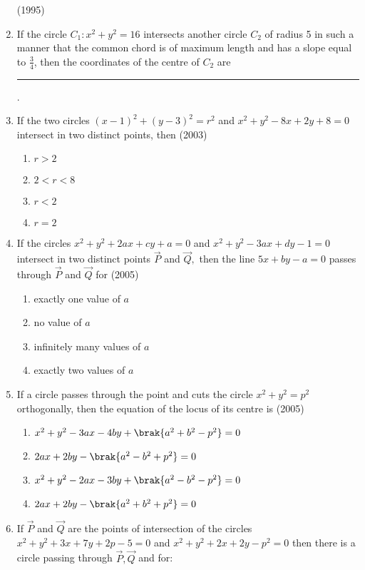 \begin{enumerate}[label=\thesubsection.\arabic*.,ref=\thesubsection.\theenumi]
	      \hfill(1995)
\item If the circle $C_1:x^{2}+y^{2}=16$ intersects another circle $C_2$ of radius 5 in such a manner that the common chord is of maximum length and has a slope equal to $\frac{3}{4}$,  then the coordinates of the centre of $C_2$ are
\rule{1cm}{0.01pt}.
%
	\hfill{}
\item If the two circles $(x-1)^2+(y-3)^2=r^2$ and $x^2+y^2-8x+2y+8=0$ intersect in two distinct points,  then \hfill(2003)
\begin{multicols}{4}
\begin{enumerate}
\item$r>2$
\item$2<r<8$
\item$r<2$
\item$r=2$
\end{enumerate}
\end{multicols}
\item If the circles $x^2+y^2+2ax+cy+a=0$ and $x^2+y^2-3ax+dy-1=0$ intersect in two distinct points $\vec{P}$ and $\vec{Q},$ then the line $5x+by-a=0$ passes through $\vec{P}$ and $\vec{Q}$ for
\hfill{(2005)}
\begin{multicols}{2}
\begin{enumerate}
\item exactly one value of $a$
\item no value of $a$
\item infinitely many values of $a$
\item exactly two values of $a$
\end{enumerate}
\end{multicols}
\item If a circle passes through the point  and cuts the circle $x^2+y^2=p^2$ orthogonally,  then the equation of the locus of its centre is 
\hfill{(2005)}
\begin{multicols}{2}
\begin{enumerate}
\item $x^2+y^2-3ax-4by+\brak{a^2+b^2-p^2}=0$
\item $2ax+2by-\brak{a^2-b^2+p^2}=0$
\item $x^2+y^2-2ax-3by+\brak{a^2-b^2-p^2}=0$
\item $2ax+2by-\brak{a^2+b^2+p^2}=0$
\end{enumerate}
\end{multicols}
\item If $\vec{P}$ and $\vec{Q}$ are the points of intersection of the circles $x^2+y^2+3x+7y+2p-5=0$ and $x^2+y^2+2x+2y-p^2=0$ then there is a circle passing through $\vec{P},  \vec{Q}$ and  for:

\end{enumerate}
